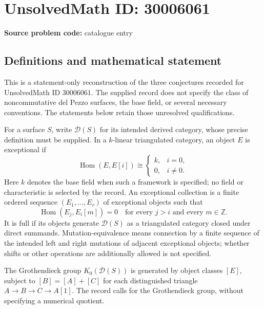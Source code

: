 \documentclass[11pt]{article}
\newcommand{\Z}{\mathbb{Z}}
\begin{document}
\section*{UnsolvedMath ID: 30006061}
\textbf{Source problem code:} catalogue entry
\subsection{Definitions and mathematical statement}
This is a statement-only reconstruction of the three conjectures recorded for UnsolvedMath ID \(30006061\). The supplied record does not specify the class of noncommutative del Pezzo surfaces, the base field, or several necessary conventions. The statements below retain those unresolved qualifications.

For a surface \(S\), write \(\mathcal D(S)\) for its intended derived category, whose precise definition must be supplied. In a \(k\)-linear triangulated category, an object \(E\) is exceptional if
\[
\operatorname{Hom}(E,E[i])\cong
\begin{cases}
k,&i=0,\\
0,&i\ne 0.
\end{cases}
\]
Here \(k\) denotes the base field when such a framework is specified; no field or characteristic is selected by the record. An exceptional collection is a finite ordered sequence \((E_1,\ldots,E_r)\) of exceptional objects such that
\[
\operatorname{Hom}(E_j,E_i[m])=0
\quad\text{for every }j>i\text{ and every }m\in\Z.
\]
It is full if its objects generate \(\mathcal D(S)\) as a triangulated category closed under direct summands. Mutation-equivalence means connection by a finite sequence of the intended left and right mutations of adjacent exceptional objects; whether shifts or other operations are additionally allowed is not specified.

The Grothendieck group \(K_0(\mathcal D(S))\) is generated by object classes \([E]\), subject to \([B]=[A]+[C]\) for each distinguished triangle \(A\to B\to C\to A[1]\). The record calls for the Grothendieck group, without specifying a numerical quotient.
\end{document}
